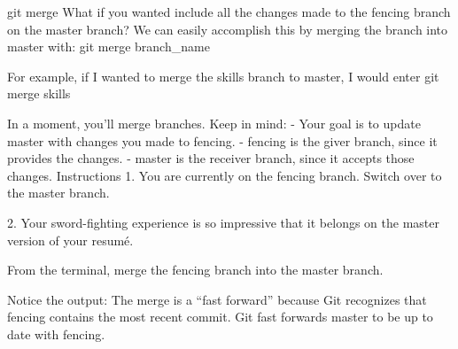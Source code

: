 git merge
    What if you wanted include all the changes made to the fencing branch on the master branch? We can easily accomplish this by merging the branch into master with:
        git merge branch_name
    
    For example, if I wanted to merge the skills branch to master, I would enter
        git merge skills
    
    In a moment, you’ll merge branches. Keep in mind:
        - Your goal is to update master with changes you made to fencing.
        - fencing is the giver branch, since it provides the changes.
        - master is the receiver branch, since it accepts those changes.
Instructions
    1.
    You are currently on the fencing branch. Switch over to the master branch.

    2.
    Your sword-fighting experience is so impressive that it belongs on the master version of your resumé.

    From the terminal, merge the fencing branch into the master branch.

    Notice the output: The merge is a “fast forward” because Git recognizes that fencing contains the most recent commit. Git fast forwards master to be up to date with fencing.
